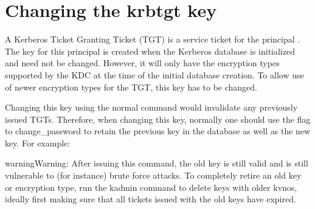 \documentclass[letterpaper,10pt,english]{sphinxmanual}
\begin{document}
\section{Changing the krbtgt key}
\label{\detokenize{admin/database:changing-the-krbtgt-key}}\label{\detokenize{admin/database:changing-krbtgt-key}}
\sphinxAtStartPar
A Kerberos Ticket Granting Ticket (TGT) is a service ticket for the
principal .  The key for this principal is created
when the Kerberos database is initialized and need not be changed.
However, it will only have the encryption types supported by the KDC
at the time of the initial database creation.  To allow use of newer
encryption types for the TGT, this key has to be changed.

\sphinxAtStartPar
Changing this key using the normal {\hyperref[\detokenize{admin/admin_commands/kadmin_local:kadmin-1}]{}}
 command would invalidate any previously issued
TGTs.  Therefore, when changing this key, normally one should use the
 flag to change\_password to retain the previous key in the
database as well as the new key.  For example:

\begin{sphinxVerbatim}[commandchars=\\\{\}]
    
\end{sphinxVerbatim}

\begin{sphinxadmonition}{warning}{Warning:}
\sphinxAtStartPar
After issuing this command, the old key is still valid
and is still vulnerable to (for instance) brute force
attacks.  To completely retire an old key or encryption
type, run the kadmin  command to delete keys
with older kvnos, ideally first making sure that all
tickets issued with the old keys have expired.
\end{sphinxadmonition}
\end{document}
